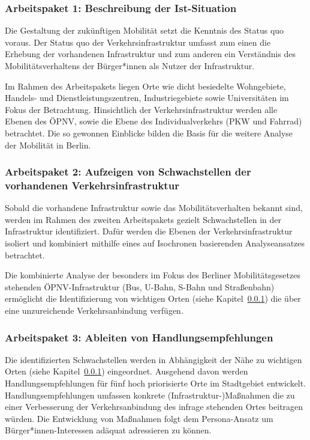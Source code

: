 \subsubsection{Arbeitspaket 1: Beschreibung der Ist-Situation}
\label{arbeitspaket_1_beschreibung_der_ist-situation}

Die Gestaltung der zukünftigen Mobilität setzt die Kenntnis des Status quo voraus. Der Status quo der Verkehrsinfrastruktur umfasst zum einen die Erhebung der vorhandenen Infrastruktur und zum anderen ein Verständnis des Mobilitätsverhaltens der Bürger*innen als Nutzer der Infrastruktur.

Im Rahmen des Arbeitspakets liegen Orte wie dicht besiedelte Wohngebiete, Handels- und Dienstleistungszentren, Industriegebiete sowie Universitäten im Fokus der Betrachtung. Hinsichtlich der Verkehrsinfrastruktur werden alle Ebenen des ÖPNV, sowie die Ebene des Individualverkehrs (PKW und Fahrrad) betrachtet. Die so gewonnen Einblicke bilden die Basis für die weitere Analyse der Mobilität in Berlin.

\subsubsection{Arbeitspaket 2: Aufzeigen von Schwachstellen der vorhandenen Verkehrsinfrastruktur}

Sobald die vorhandene Infrastruktur sowie das Mobilitätsverhalten bekannt sind, werden im Rahmen des zweiten Arbeitspakets gezielt Schwachstellen in der Infrastruktur identifiziert. Dafür werden die Ebenen der Verkehrsinfrastruktur isoliert und kombiniert mithilfe eines auf Isochronen basierenden Analyseansatzes betrachtet.

Die kombinierte Analyse der besonders im Fokus des Berliner Mobilitätsgesetzes stehenden ÖPNV-Infrastruktur (Bus, U-Bahn, S-Bahn und Straßenbahn) ermöglicht die Identifizierung von wichtigen Orten (siehe Kapitel~\ref{arbeitspaket_1_beschreibung_der_ist-situation}) die über eine unzureichende Verkehrsanbindung verfügen.

\subsubsection{Arbeitspaket 3: Ableiten von Handlungsempfehlungen}
\label{arbeitspaket_3_ableiten_von_handlungsempfehlungen}

Die identifizierten Schwachstellen werden in Abhängigkeit der Nähe zu wichtigen Orten (siehe Kapitel~\ref{arbeitspaket_1_beschreibung_der_ist-situation}) eingeordnet. Ausgehend davon werden Handlungsempfehlungen für fünf hoch priorisierte Orte im Stadtgebiet entwickelt. Handlungsempfehlungen umfassen konkrete (Infrastruktur-)Maßnahmen die zu einer Verbesserung der Verkehrsanbindung des infrage stehenden Ortes beitragen würden. Die Entwicklung von Maßnahmen folgt dem Persona-Ansatz um Bürger*innen-Interessen adäquat adressieren zu können.

